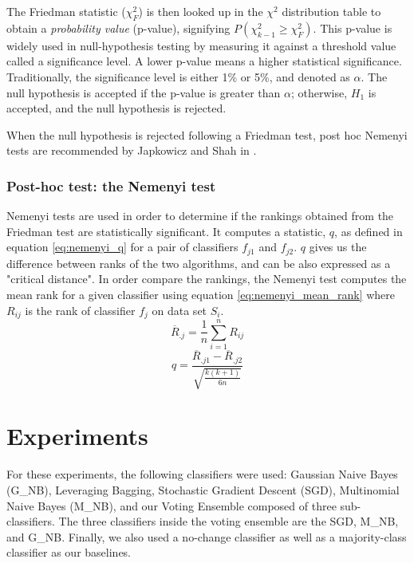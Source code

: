 The Friedman statistic ($\chi^2_F$) is then looked up in the $\chi^2$ distribution table to obtain a \textit{probability value} (p-value), signifying $P(\chi^2_{k-1} \geq \chi^2_F )$. This p-value is widely used in null-hypothesis testing by measuring it against a threshold value called a significance level. A lower p-value means a higher statistical significance. Traditionally, the significance level is either 1\% or 5\%, and denoted as $\alpha$. The null hypothesis is accepted if the p-value is greater than $\alpha$; otherwise, $H_1$ is accepted, and the null hypothesis is rejected.

When the null hypothesis is rejected following a Friedman test, post hoc Nemenyi tests are recommended by Japkowicz and Shah in \cite{japkowicz2011evaluating}.

\subsubsection{Post-hoc test: the Nemenyi test}
Nemenyi tests are used in order to determine if the rankings obtained from the Friedman test are statistically significant. It computes a statistic, $q$, as defined in equation \ref{eq:nemenyi_q} for a pair of classifiers $f_{j1}$ and $f_{j2}$. $q$ gives us the difference between ranks of the two algorithms, and can be also expressed as a "critical distance". In order compare the rankings, the Nemenyi test computes the mean rank for a given classifier using equation \ref{eq:nemenyi_mean_rank} where $R_{ij}$ is the rank of classifier $f_j$ on data set $S_i$.
\begin{equation}
\label{eq:nemenyi_q}
\overline{R}_{.j}=\frac{1}{n}\sum_{i=1}^nR_{ij}
\end{equation}\begin{equation}
\label{eq:nemenyi_mean_rank}
q=\frac{\overline{R}_{.j1}-\overline{R}_{.j2}}{\sqrt{\frac{k(k+1)}{6n}}}
\end{equation}

\section{Experiments}
For these experiments, the following classifiers were used: Gaussian Naive Bayes (G\_NB), Leveraging Bagging, Stochastic Gradient Descent (SGD), Multinomial Naive Bayes (M\_NB), and our Voting Ensemble composed of three sub-classifiers. The three classifiers inside the voting ensemble are the SGD, M\_NB, and G\_NB. Finally, we also used a no-change classifier as well as a majority-class classifier as our baselines.

